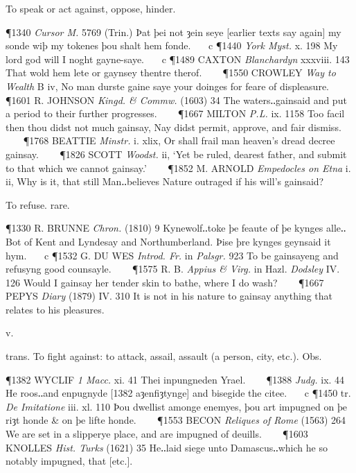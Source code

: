 \begin{description}[wide, labelwidth=!, labelindent=0pt]
\begin{myenumerate}
 To speak or act against, oppose, hinder.

\P 1340  \textit{Cursor M.} 5769 (Trin.) Þat þei not ȝein seye [earlier texts say again] my sonde wiþ my tokenes þou shalt hem fonde.    c 
\P 1440 \textit{York  Myst.} x. 198 My lord god will I noght gayne-saye.    c 
\P 1489 CAXTON  \textit{Blanchardyn} xxxviii. 143 That wold hem lete or gaynsey thentre therof.    
\P 1550 CROWLEY  \textit{Way to Wealth} B iv, No man durste gaine saye your doinges for feare of displeasure.    
\P 1601 R. JOHNSON  \textit{Kingd. \& Commw.} (1603) 34 The waters‥gainsaid and put a period to their further progresses.    
\P 1667 MILTON  \textit{P.L.} ix. 1158 Too facil then thou didst not much gainsay, Nay didst permit, approve, and fair dismiss.    
\P 1768 BEATTIE  \textit{Minstr.} i. xlix, Or shall frail man heaven's dread decree gainsay.    
\P 1826 SCOTT  \textit{Woodst.} ii, ‘Yet be ruled, dearest father, and submit to that which we cannot gainsay.’    
\P 1852 M. ARNOLD  \textit{Empedocles on Etna} i. ii, Why is it, that still Man‥believes Nature outraged if his will's gainsaid?

 To refuse. rare.

\P 1330 R. BRUNNE  \textit{Chron.} (1810) 9 Kynewolf‥toke þe feaute of þe kynges alle‥Bot of Kent and Lyndesay and Northumberland. Þise þre kynges geynsaid it hym.    c 
\P 1532 G. DU WES  \textit{Introd. Fr.} in \textit{Palsgr.} 923 To be gainsayeng and refusyng good counsayle.    
\P 1575 R. B. \textit{Appius  \& Virg.} in Hazl. \textit{Dodsley} IV. 126 Would I gainsay her tender skin to bathe, where I do wash?    
\P 1667 PEPYS  \textit{Diary} (1879) IV. 310 It is not in his nature to gainsay anything that relates to his pleasures.
\end{myenumerate}


 v.

\noindent {}

\noindent [a. F. impugner (1363 in Godefroy) = Pr. im-, enpugnar, Sp. impugnar, It. impugnare, ad. L. impugnāre to attack, assail, f. im- (im-1) + pugnāre to fight.]
\vspace{-0.3cm}

\begin{myenumerate}

 trans. To fight against: to attack, assail, assault (a person, city, etc.). Obs.

\P 1382 WYCLIF  \textit{1 Macc.} xi. 41 Thei inpungneden Yrael.    
\P 1388 \textit{Judg.} ix. 44 He roos‥and enpugnyde [1382 aȝenfiȝtynge]  and bisegide the citee.    c 
\P 1450 tr.  \textit{De Imitatione} iii. xl. 110 Þou dwellist amonge enemyes, þou art impugned on þe riȝt honde \& on þe lifte honde.    
\P 1553 BECON  \textit{Reliques of Rome} (1563) 264 We are set in a slipperye place, and are impugned of deuills.    
\P 1603 KNOLLES  \textit{Hist. Turks} (1621) 35 He‥laid siege unto Damascus‥which he so notably impugned, that [etc.].


\end{myenumerate}
\end{description}
